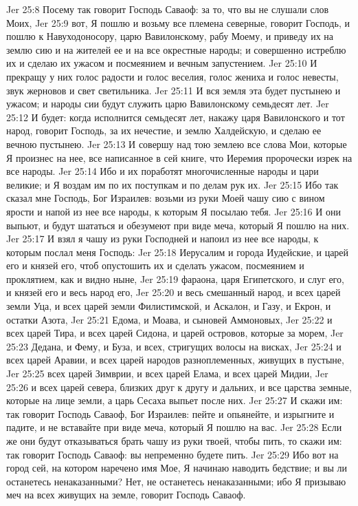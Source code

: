 Jer 25:8  Посему так говорит Господь Саваоф: за то, что вы не слушали слов Моих,
Jer 25:9  вот, Я пошлю и возьму все племена северные, говорит Господь, и пошлю к Навуходоносору, царю Вавилонскому, рабу Моему, и приведу их на землю сию и на жителей ее и на все окрестные народы; и совершенно истреблю их и сделаю их ужасом и посмеянием и вечным запустением.
Jer 25:10  И прекращу у них голос радости и голос веселия, голос жениха и голос невесты, звук жерновов и свет светильника.
Jer 25:11  И вся земля эта будет пустынею и ужасом; и народы сии будут служить царю Вавилонскому семьдесят лет.
Jer 25:12  И будет: когда исполнится семьдесят лет, накажу царя Вавилонского и тот народ, говорит Господь, за их нечестие, и землю Халдейскую, и сделаю ее вечною пустынею.
Jer 25:13  И совершу над тою землею все слова Мои, которые Я произнес на нее, все написанное в сей книге, что Иеремия пророчески изрек на все народы.
Jer 25:14  Ибо и их поработят многочисленные народы и цари великие; и Я воздам им по их поступкам и по делам рук их.
Jer 25:15  Ибо так сказал мне Господь, Бог Израилев: возьми из руки Моей чашу сию с вином ярости и напой из нее все народы, к которым Я посылаю тебя.
Jer 25:16  И они выпьют, и будут шататься и обезумеют при виде меча, который Я пошлю на них.
Jer 25:17  И взял я чашу из руки Господней и напоил из нее все народы, к которым послал меня Господь:
Jer 25:18  Иерусалим и города Иудейские, и царей его и князей его, чтоб опустошить их и сделать ужасом, посмеянием и проклятием, как и видно ныне,
Jer 25:19  фараона, царя Египетского, и слуг его, и князей его и весь народ его,
Jer 25:20  и весь смешанный народ, и всех царей земли Уца, и всех царей земли Филистимской, и Аскалон, и Газу, и Екрон, и остатки Азота,
Jer 25:21  Едома, и Моава, и сыновей Аммоновых,
Jer 25:22  и всех царей Тира, и всех царей Сидона, и царей островов, которые за морем,
Jer 25:23  Дедана, и Фему, и Буза, и всех, стригущих волосы на висках,
Jer 25:24  и всех царей Аравии, и всех царей народов разноплеменных, живущих в пустыне,
Jer 25:25  всех царей Зимврии, и всех царей Елама, и всех царей Мидии,
Jer 25:26  и всех царей севера, близких друг к другу и дальних, и все царства земные, которые на лице земли, а царь Сесаха выпьет после них.
Jer 25:27  И скажи им: так говорит Господь Саваоф, Бог Израилев: пейте и опьянейте, и изрыгните и падите, и не вставайте при виде меча, который Я пошлю на вас.
Jer 25:28  Если же они будут отказываться брать чашу из руки твоей, чтобы пить, то скажи им: так говорит Господь Саваоф: вы непременно будете пить.
Jer 25:29  Ибо вот на город сей, на котором наречено имя Мое, Я начинаю наводить бедствие; и вы ли останетесь ненаказанными? Нет, не останетесь ненаказанными; ибо Я призываю меч на всех живущих на земле, говорит Господь Саваоф.
